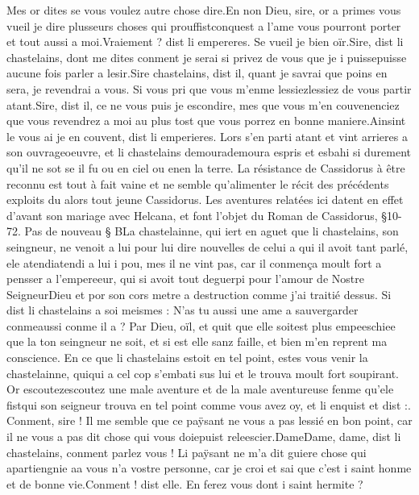 \documentclass{article}
\begin{document}
\begin{pages}
      Mes or dites se vous voulez autre chose dire.En non Dieu, sire, or a primes vous vueil je dire plusseurs choses qui 
      prouffistconquest a l’ame vous pourront porter et tout aussi a moi.Vraiement ? dist li empereres. Se vueil je bien oïr.Sire, dist li chastelains, 
      dont me dites conment je serai si privez de vous que je i 
      puissepuisse aucune fois parler a lesir.Sire chastelains, dist il, quant je savrai que poins en sera, je revendrai a vous. 
      Si vous pri que vous m’enme 
      lessiezlessiez de vous partir atant.Sire, dist il, ce ne vous puis je escondire, 
   mes que vous m’en couvenenciez que vous revendrez a moi au plus tost que vous porrez en bonne maniere.Ainsint le vous ai je en couvent, dist li emperieres. 
   Lors s’en parti atant et vint arrieres a son ouvrageoeuvre, 
   et li chastelains demourademoura espris et 
   esbahi si durement qu’il ne sot se il fu ou en ciel ou 
   enen la terre. La résistance de Cassidorus 
   à être reconnu est tout à fait vaine et ne semble qu'alimenter le récit des précédents exploits du alors tout jeune Cassidorus.
   Les aventures relatées ici datent en effet d'avant son mariage avec Helcana, et font l'objet du Roman de Cassidorus, §10-72. \pend
\pstart Pas de nouveau § BLa chastelainne, 
   qui iert en aguet que li chastelains, son seingneur, ne venoit a lui pour lui dire nouvelles 
   de celui a qui il avoit tant parlé, ele 
   atendiatendi a lui i pou, mes il ne vint pas, 
   car il conmença moult fort a pensser a 
   l’empereeur, qui si avoit tout deguerpi pour l’amour de 
   Nostre SeigneurDieu et por son cors metre a destruction comme j'ai traitié dessus. 
   Si dist li chastelains a soi meismes :
   N’as tu aussi une ame a sauvergarder 
      conmeaussi conme il a ? Par Dieu, oïl, 
      et quit que elle soitest plus empeeschiee 
      que la ton seingneur ne soit, et si est elle sanz faille, et bien m’en reprent ma conscience. \pend
\pstart En ce que li chastelains estoit en tel point, 
   estes vous venir la chastelainne, 
   quiqui a cel cop s’embati sus lui et le trouva moult fort soupirant. 
   Or escoutezescoutez une male aventure et de 
   la male aventureuse fenme qu’ele fistqui son seigneur trouva en tel point comme vous avez oy,
   et li enquist et dist :.
   Conment, sire ! Il me semble que ce paÿsant ne vous a pas 
      lessié en bon point, 
      car il ne vous a pas dit chose qui vous doiepuist releescier.DameDame, dame, dist 
      li chastelains, conment parlez vous ! Li paÿsant ne m’a dit 
      guiere chose qui apartiengnie aa vous n'a vostre personne, 
   car je croi et sai que c’est i saint honme et de bonne vie.Conment ! dist elle. En ferez vous dont i saint hermite ? 

\end{pages}
\end{document}
